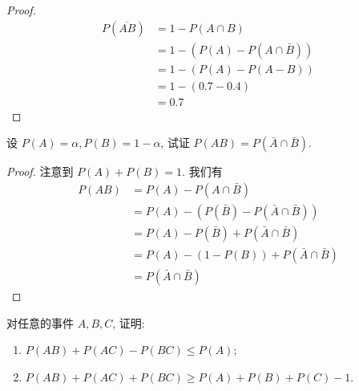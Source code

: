 \documentclass[../main.tex]{subfiles}
\begin{document}
\begin{proof}
    \[
    \begin{aligned}
    P\left( \overline{AB} \right)&= 1-P\left( A\cap B \right)\\ 
     &= 1-\left( P\left( A \right)-P\left( A\cap \bar{B} \right)   \right)\\ 
      &= 1-\left( P\left( A \right)-P\left( A-B \right)   \right)\\ 
       &= 1-\left( 0.7-0.4 \right)\\ 
        &= 0.7      
    \end{aligned}
    \]
\end{proof}
\begin{exercise}{}{}
设 $P(A) = \alpha, P(B) = 1-\alpha$, 试证 $P(AB) = P(\bar{A}\cap\bar{B})$.
\end{exercise}
\begin{proof}
    注意到 \(  P\left( A \right)+ P\left( B \right)= 1    \). 我们有 
 \[
 \begin{aligned}
 P\left( AB \right)&= P\left( A \right)-P\left( A\cap \bar{B} \right)\\ 
  &=     P\left( A \right)-\left( P\left( \bar{B} \right)-P\left( \bar{A}\cap \bar{B} \right)   \right)\\ 
   &= P\left( A \right) -P\left( \bar{B} \right)+ P\left( \bar{A}\cap \bar{B} \right)     \\ 
    &= P\left( A \right)-\left( 1-P\left( B \right)  \right)+ P\left( \bar{A}\cap \bar{B} \right)\\ 
     &= P\left( \bar{A}\cap \bar{B} \right)    
 \end{aligned}
 \]
\end{proof}
\begin{exercise}{}{}
对任意的事件 $A, B, C$, 证明:
\begin{enumerate}
    \item $P(AB) + P(AC) - P(BC) \le P(A)$;
    \item $P(AB) + P(AC) + P(BC) \ge P(A) + P(B) + P(C) - 1$.
\end{enumerate}
\end{exercise}
\end{document}
